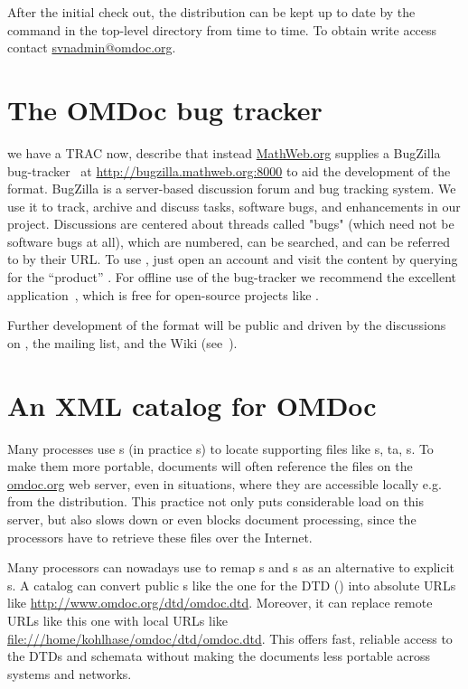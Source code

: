 After the initial check out, the {\omdoc} distribution can be kept up to date by
the command {} in the top-level directory from time to time. To obtain write
access contact \url{svnadmin@omdoc.org}.


\section{The OMDoc bug tracker}\label{sec:bugzilla}
\begin{oldpart}{we have a TRAC now, describe that instead}
  \url{MathWeb.org} supplies a BugZilla bug-tracker~\cite{bugzilla:URL} at
  \url{http://bugzilla.mathweb.org:8000} to aid the development of the {\omdoc}
  format. BugZilla is a server-based discussion forum and bug tracking system. We use it
  to track, archive and discuss tasks, software bugs, and enhancements in our
  project. Discussions are centered about threads called "bugs" (which need not be
  software bugs at all), which are numbered, can be searched, and can be referred to by
  their URL. To use {\bugzilla}, just open an account and visit the {\omdoc} content by
  querying for the ``product'' {\omdoc}. For offline use of the bug-tracker we recommend
  the excellent {} application~\cite{deskzilla:URL}, which is free for
  open-source projects like {\omdoc}.

  Further development of the {\omdoc} format will be public and driven by the discussions
  on {\bugzilla}, the {\omdoc} mailing list, and the {\omdoc} Wiki
  (see~).
\end{oldpart}

\section{An XML catalog for OMDoc}\label{sec:catalog}  
  Many {\xml} processes use {s} (in practice {s}) to
  locate supporting files like {s}, {ta},
  {s}. To make them more portable, {\omdoc} documents will often
  reference the files on the \url{omdoc.org} web server, even in situations, where
  they are accessible locally e.g. from the {\omdoc} distribution. This practice not only
  puts considerable load on this server, but also slows down or even blocks document
  processing, since the {\xml} processors have to retrieve these files over the Internet.

  Many processors can nowadays use  to remap
  {s} and {s} as an alternative to explicit
  {s}. A catalog can convert public {}s like the
  one for the {\omdoc} DTD ({}) into absolute URLs
  like \url{http://www.omdoc.org/dtd/omdoc.dtd}. Moreover, it can replace remote URLs like
  this one with local URLs like \url{file:///home/kohlhase/omdoc/dtd/omdoc.dtd}.  This
  offers fast, reliable access to the DTDs and schemata without making the documents less
  portable across systems and networks.

